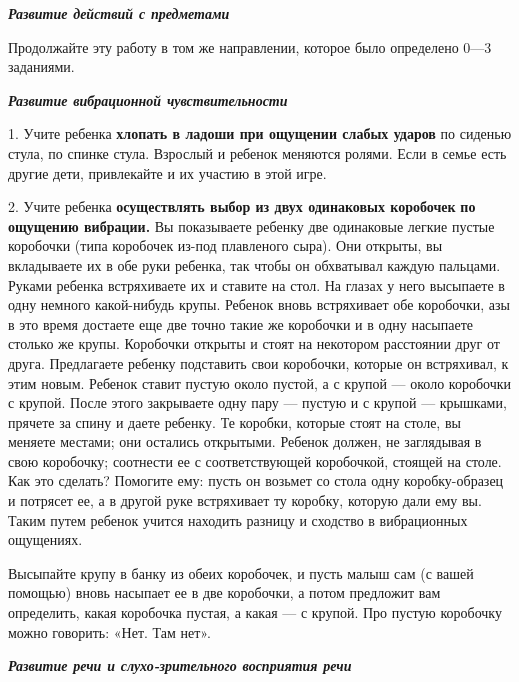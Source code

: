 \documentclass{book}
\renewcommand{\emph}[1]{\textit{#1}}
\begin{document}
\emph{\textbf{Развитие действий с предметами}}

Продолжайте эту работу в том же направлении, которое было определено
0---3 заданиями.

\textbf{\emph{Развитие вибрационной чувствительности}}

1. Учите ребенка \textbf{хлопать в ладоши при ощущении слабых ударов} по
сиденью стула, по спинке стула. Взрослый и ребенок меняются ролями. Если
в семье есть другие дети, привлекайте и их участию в этой игре.

2. Учите ребенка \textbf{осуществлять выбор из двух одинаковых
коробочек} \textbf{по ощущению вибрации.} Вы показываете ребенку две
одинаковые легкие пустые коробочки (типа коробочек из-под плавленого
сыра). Они открыты, вы вкладываете их в обе руки ребенка, так чтобы он
обхватывал каждую пальцами. Руками ребенка встряхиваете их и ставите на
стол. На глазах у него высыпаете в одну немного какой-нибудь крупы.
Ребенок вновь встряхивает обе коробочки, азы в это время достаете еще
две точно такие же коробочки и в одну насыпаете столько же крупы.
Коробочки открыты и стоят на некотором расстоянии друг от друга.
Предлагаете ребенку подставить свои коробочки, которые он встряхивал, к
этим новым. Ребенок ставит пустую около пустой, а с крупой --- около
коробочки с крупой. После этого закрываете одну пару --- пустую и с
крупой --- крышками, прячете за спину и даете ребенку. Те коробки,
которые стоят на столе, вы меняете местами; они остались открытыми.
Ребенок должен, не заглядывая в свою коробочку; соотнести ее с
соответствующей коробочкой, стоящей на столе. Как это сделать? Помогите
ему: пусть он возьмет со стола одну коробку-образец и потрясет ее, а в
другой руке встряхивает ту коробку, которую дали ему вы. Таким путем
ребенок учится находить разницу и сходство в вибрационных ощущениях.

Высыпайте крупу в банку из обеих коробочек, и пусть малыш сам (с вашей
помощью) вновь насыпает ее в две коробочки, а потом предложит вам
определить, какая коробочка пустая, а какая --- с крупой. Про пустую
коробочку можно говорить: «Нет. Там нет».

\emph{\textbf{Развитие речи и слухо-зрительного восприятия речи}}
\end{document}
